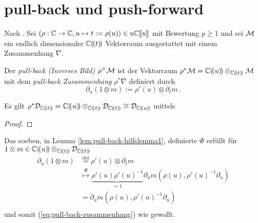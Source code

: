 \section{pull-back und push-forward}
\begin{comment}
\cite[1.3]{hotta2007d}
\end{comment}

Nach \cite[1.a]{sabbah_Fourier-local}. Sei $(\rho:\mathbb{C}\rightarrow \mathbb{C} , u\mapsto
t:=\rho(u))\in u{\mathbb C\llbracket u\rrbracket}$ mit Bewertung $p\geq1$ und sei $\mathcal{M}$ ein endlich
dimensionaler $\mathbb{C}(\!(t)\!)$ Vektorraum ausgestattet mit einem Zusammenhang
$\nabla$.
\begin{defn} \label{defn:pull-back}
\cite[1.a]{sabbah_Fourier-local}
Der \emph{pull-back (Inverses Bild)} $\rho^{+}\mathcal{M}$ ist der Vektorraum
$\rho^{*}\mathcal{M}=\mathbb{C}(\!(u)\!)\otimes_{\mathbb{C}(\!(t)\!)}\mathcal{M}$ mit dem \emph{pull-back
Zusammenhang} $\rho^*\nabla$ definiert durch 
\begin{equation} \label{eq:pull-back-zusammenhang}
\partial_u(1\otimes m):=\rho'(u)\otimes\partial_tm \,.
\end{equation}
\end{defn}
%
\begin{lem} \label{lem:pull-back-hilfslemma1}
\def\myT{\cD_{\Cftl}}
\def\myU{\cD_{\Cful}}
Es gilt $\rho^*\myT=\Cful\otimes_{\Cftl}\myT \cong \myU$ mittels
\begin{center}
\end{center}
\end{lem}
\begin{proof}
\end{proof}
\begin{bem}
Das soeben, in Lemma \ref{lem:pull-back-hilfslemma1}, definierte $\Phi$ erfüllt
für $1\otimes m\in \Cful\otimes_{\Cftl}\myT$
\begin{align*}
\partial_u(1\otimes m) &\overset{\mbox{def}}{=} \rho'(u)\otimes\partial_t m \\
&\overset{\Phi}{\mapsto} \underset{=1}{\underbrace{\rho'(u)\rho'(u)^{-1}}}
  \partial_u m(\rho(u),\rho'(u)^{-1}\partial_u) \\
&= \partial_u m(\rho(u),\rho'(u)^{-1}\partial_u)\\
\end{align*}
und somit (\ref{eq:pull-back-zusammenhang}) wie gewollt.
\end{bem}
